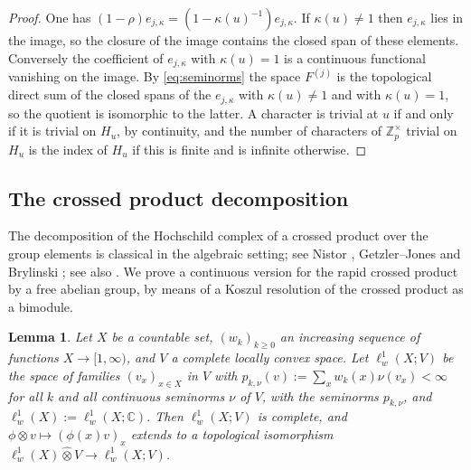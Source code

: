 \documentclass[11pt]{amsart}
\newtheorem{lemma}[theorem]{Lemma}
\theoremstyle{definition}
\theoremstyle{remark}
\newcommand{\C}{\mathbb C}
\newcommand{\Z}{\mathbb Z}
\begin{document}
\begin{proof}
One has $(1-\rho)e_{j,\kappa}=(1-\kappa(u)^{-1})e_{j,\kappa}$.  If
$\kappa(u)\ne1$ then $e_{j,\kappa}$ lies in the image, so the closure of the
image contains the closed span of these elements.  Conversely the coefficient
of $e_{j,\kappa}$ with $\kappa(u)=1$ is a continuous functional vanishing on the
image.  By \eqref{eq:seminorms} the space $F^{(j)}$ is the topological direct
sum of the closed spans of the $e_{j,\kappa}$ with $\kappa(u)\ne1$ and with
$\kappa(u)=1$, so the quotient is isomorphic to the latter.  A character is
trivial at $u$ if and only if it is trivial on $H_u$, by continuity, and the
number of characters of $\Z_p^{\times}$ trivial on $H_u$ is the index of $H_u$
if this is finite and is infinite otherwise.
\end{proof}

\subsection{The crossed product decomposition}

The decomposition of the Hochschild complex of a crossed product over the
group elements is classical in the algebraic setting; see Nistor
\cite{Nistor}, Getzler--Jones \cite{GetzlerJones} and Brylinski
\cite{Brylinski};
see also \cite{BrylinskiAIF}.  We prove a continuous version for the rapid crossed
product by a free abelian group, by means of a Koszul resolution of the
crossed product as a bimodule.

\begin{lemma}\label{lem:ell1}
Let $X$ be a countable set, $(w_k)_{k\ge0}$ an increasing sequence of
functions $X\to[1,\infty)$, and $V$ a complete locally convex space.  Let
$\ell^{1}_{w}(X;V)$ be the space of families $(v_x)_{x\in X}$ in $V$ with
$p_{k,\nu}(v):=\sum_xw_k(x)\nu(v_x)<\infty$ for all $k$ and all continuous
seminorms $\nu$ of $V$, with the seminorms $p_{k,\nu}$, and
$\ell^{1}_{w}(X):=\ell^{1}_{w}(X;\C)$.  Then $\ell^{1}_{w}(X;V)$ is complete, and
$\phi\otimes v\mapsto(\phi(x)v)_x$ extends to a topological isomorphism
$\ell^{1}_{w}(X)\widehat\otimes V\to\ell^{1}_{w}(X;V)$.
\end{lemma}
\end{document}
